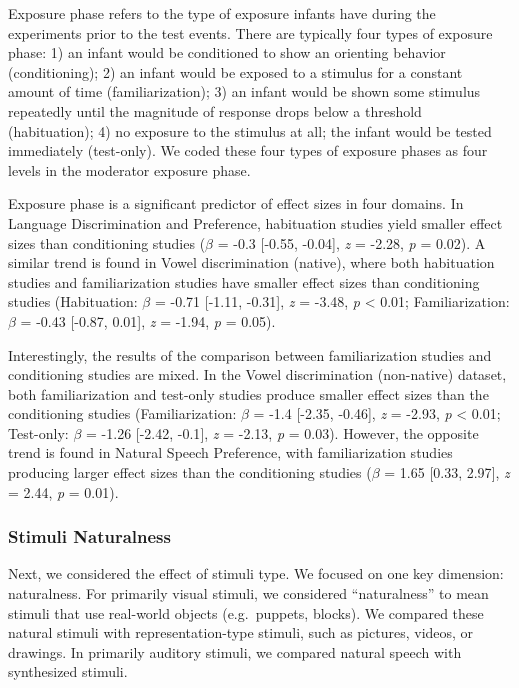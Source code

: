 \documentclass[10pt, letterpaper]{article}
\begin{document}
Exposure phase refers to the type of exposure infants have during the
experiments prior to the test events. There are typically four types of
exposure phase: 1) an infant would be conditioned to show an orienting
behavior (conditioning); 2) an infant would be exposed to a stimulus for
a constant amount of time (familiarization); 3) an infant would be shown
some stimulus repeatedly until the magnitude of response drops below a
threshold (habituation); 4) no exposure to the stimulus at all; the
infant would be tested immediately (test-only). We coded these four
types of exposure phases as four levels in the moderator exposure phase.

Exposure phase is a significant predictor of effect sizes in four
domains. In Language Discrimination and Preference, habituation studies
yield smaller effect sizes than conditioning studies (\(\beta\) = -0.3
{[}-0.55, -0.04{]}, \emph{z} = -2.28, \emph{p} = 0.02). A similar trend
is found in Vowel discrimination (native), where both habituation
studies and familiarization studies have smaller effect sizes than
conditioning studies (Habituation: \(\beta\) = -0.71 {[}-1.11, -0.31{]},
\emph{z} = -3.48, \emph{p} \textless{} 0.01; Familiarization: \(\beta\)
= -0.43 {[}-0.87, 0.01{]}, \emph{z} = -1.94, \emph{p} = 0.05).

Interestingly, the results of the comparison between familiarization
studies and conditioning studies are mixed. In the Vowel discrimination
(non-native) dataset, both familiarization and test-only studies produce
smaller effect sizes than the conditioning studies (Familiarization:
\(\beta\) = -1.4 {[}-2.35, -0.46{]}, \emph{z} = -2.93, \emph{p}
\textless{} 0.01; Test-only: \(\beta\) = -1.26 {[}-2.42, -0.1{]},
\emph{z} = -2.13, \emph{p} = 0.03). However, the opposite trend is found
in Natural Speech Preference, with familiarization studies producing
larger effect sizes than the conditioning studies (\(\beta\) = 1.65
{[}0.33, 2.97{]}, \emph{z} = 2.44, \emph{p} = 0.01).

\hypertarget{stimuli-naturalness}{%
\subsubsection{Stimuli Naturalness}\label{stimuli-naturalness}}

Next, we considered the effect of stimuli type. We focused on one key
dimension: naturalness. For primarily visual stimuli, we considered
``naturalness'' to mean stimuli that use real-world objects
(e.g.~puppets, blocks). We compared these natural stimuli with
representation-type stimuli, such as pictures, videos, or drawings. In
primarily auditory stimuli, we compared natural speech with synthesized
stimuli.
\end{document}
